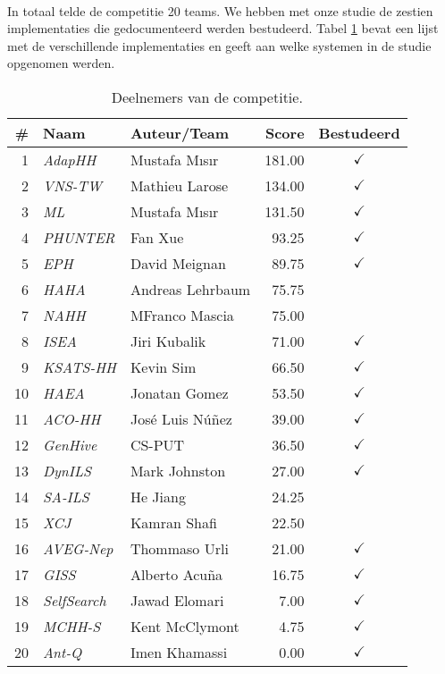 \paragraph{}
In totaal telde de competitie 20 teams. We hebben met onze studie de zestien implementaties die gedocumenteerd werden bestudeerd. Tabel \ref{tbl:chescParticipants} bevat een lijst met de verschillende implementaties en geeft aan welke systemen in de studie opgenomen werden.

\begin{table}[hbt]
  \centering
  \begin{tabular}{rllrc} \toprule
    \#&Naam&Auteur/Team&Score&Bestudeerd\\\midrule
    1&	\emph{AdapHH}\cite{chesc-adaphh,chesc-adaphh2,348072}	&	Mustafa M\i{}s\i{}r&	181.00&	$\checkmark$\\
    2&	\emph{VNS-TW}\cite{chesc-vns-tw}&				Mathieu Larose&		134.00&	$\checkmark$\\
    3&	\emph{ML}\cite{chesc-ml,chesc-ml2}&				Mustafa M\i{}s\i{}r&	131.50&	$\checkmark$\\
    4&	\emph{PHUNTER}\cite{chesc-phunter}&				Fan Xue&		93.25&	$\checkmark$\\
    5&	\emph{EPH}\cite{chesc-eph}&					David Meignan&		89.75&	$\checkmark$\\
    6&	\emph{HAHA}&							Andreas Lehrbaum&	75.75&	\\
    7&	\emph{NAHH}&							MFranco Mascia&		75.00&	\\
    8&	\emph{ISEA}\cite{chesc-isea}&					Jiri Kubalik&		71.00&	$\checkmark$\\
    9&	\emph{KSATS-HH}\cite{chesc-ksats-hh}&				Kevin Sim&		66.50&	$\checkmark$\\
    10&	\emph{HAEA}\cite{chesc-haea}&					Jonatan Gomez&		53.50&	$\checkmark$\\
    11&	\emph{ACO-HH}\cite{chesc-aco-hh}&				Jos\'e Luis N\'u\~nez&	39.00&	$\checkmark$\\
    12&	\emph{GenHive}\cite{chesc-genhive}&				CS-PUT&			36.50&	$\checkmark$\\
    13&	\emph{DynILS}\cite{chesc-dynils}&				Mark Johnston&		27.00&	$\checkmark$\\
    14&	\emph{SA-ILS}&							He Jiang&		24.25&	\\
    15&	\emph{XCJ}&							Kamran Shafi&		22.50&	\\
    16&	\emph{AVEG-Nep}\cite{chesc-aveg-nep}&				Thommaso Urli&		21.00&	$\checkmark$\\
    17&	\emph{GISS}\cite{chesc-giss}&					Alberto Acu\~na&	16.75&	$\checkmark$\\
    18&	\emph{SelfSearch}\cite{chesc-selfsearch}&			Jawad Elomari&		7.00&	$\checkmark$\\
    19&	\emph{MCHH-S}\cite{chesc-mchh-s,conf/gecco/McClymontK11}&	Kent McClymont&		4.75&	$\checkmark$\\
    20&	\emph{Ant-Q}\cite{chesc-ant-q,sis/ant-q}&			Imen Khamassi&		0.00&	$\checkmark$\\
    \bottomrule
  \end{tabular}
  \caption{Deelnemers van de \abchescy{} competitie\cite{chesc-results}.}
  \label{tbl:chescParticipants}
\end{table}

